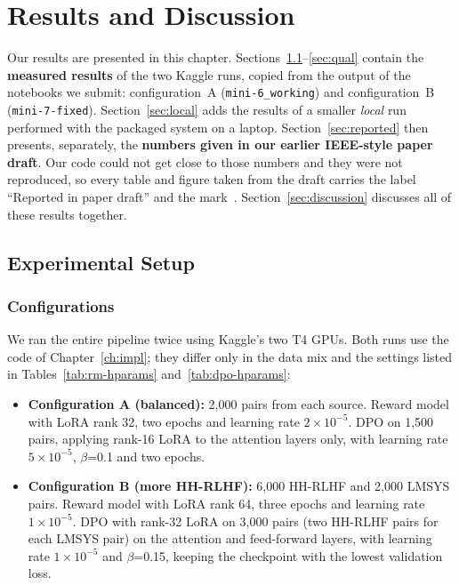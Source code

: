\chapter{Results and Discussion}
\label{ch:results}

Our results are presented in this chapter. Sections~\ref{sec:setup}--\ref{sec:qual} contain the \textbf{measured results} of the two Kaggle runs, copied from the output of the notebooks we submit: configuration~A (\texttt{mini-6\_working}) and configuration~B (\texttt{mini-7-fixed}). Section~\ref{sec:local} adds the results of a smaller \emph{local} run performed with the packaged system on a laptop. Section~\ref{sec:reported} then presents, separately, the \textbf{numbers given in our earlier IEEE-style paper draft}. Our code could not get close to those numbers and they were not reproduced, so every table and figure taken from the draft carries the label ``Reported in paper draft'' and the mark~\reportedtag. Section~\ref{sec:discussion} discusses all of these results together.

\section{Experimental Setup}
\label{sec:setup}

\subsection{Configurations}
We ran the entire pipeline twice using Kaggle's two T4 GPUs. Both runs use the code of Chapter~\ref{ch:impl}; they differ only in the data mix and the settings listed in Tables~\ref{tab:rm-hparams} and~\ref{tab:dpo-hparams}:
\begin{itemize}
  \item \textbf{Configuration A (balanced):} 2,000 pairs from each source. Reward model with LoRA rank 32, two epochs and learning rate $2\times10^{-5}$. DPO on 1,500 pairs, applying rank-16 LoRA to the attention layers only, with learning rate $5\times10^{-5}$, $\beta$=0.1 and two epochs.
  \item \textbf{Configuration B (more HH-RLHF):} 6,000 HH-RLHF and 2,000 LMSYS pairs. Reward model with LoRA rank 64, three epochs and learning rate $1\times10^{-5}$. DPO with rank-32 LoRA on 3,000 pairs (two HH-RLHF pairs for each LMSYS pair) on the attention and feed-forward layers, with learning rate $1\times10^{-5}$ and $\beta$=0.15, keeping the checkpoint with the lowest validation loss.
\end{itemize}

